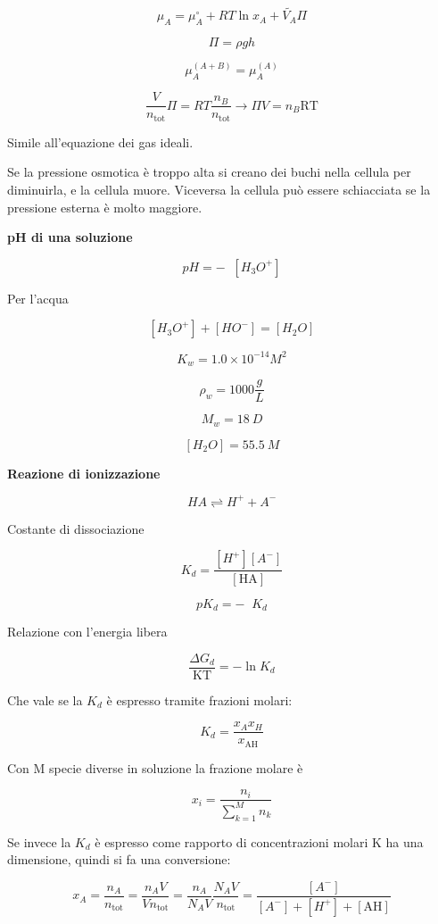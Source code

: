 \[\mu_{A} = \mu_{A}^{\circ} + RT\ln x_{A} + \tilde{V_{A}}\Pi\]

\[\Pi = \rho gh\]

\[\mu_{A}^{(A + B)} = \mu_{A}^{(A)}\]

\[\frac{V}{n_{\text{tot}}}\Pi = RT\frac{n_{B}}{n_{\text{tot}}} \rightarrow \Pi V = n_{B}\text{RT}\]

Simile all'equazione dei gas ideali.

Se la pressione osmotica è troppo alta si creano dei buchi nella cellula
per diminuirla, e la cellula muore. Viceversa la cellula può essere
schiacciata se la pressione esterna è molto maggiore.

\textbf{pH di una soluzione}

\[pH = - \operatorname{}\left\lbrack H_{3}O^{+} \right\rbrack\]

Per l'acqua

\[\left\lbrack H_{3}O^{+} \right\rbrack + \left\lbrack HO^{-} \right\rbrack = \left\lbrack H_{2}O \right\rbrack\]

\[K_{w} = 1.0 \times 10^{- 14}M^{2}\]

\[\rho_{w} = 1000\frac{g}{L}\]

\[M_{w} = 18\ D\]

\[\left\lbrack H_{2}O \right\rbrack = 55.5\ M\]

\textbf{Reazione di ionizzazione}

\[HA \rightleftharpoons H^{+} + A^{-}\]

Costante di dissociazione

\[K_{d} = \frac{\left\lbrack H^{+} \right\rbrack\left\lbrack A^{-} \right\rbrack}{\left\lbrack \text{HA} \right\rbrack}\]

\[pK_{d} = - \operatorname{}K_{d}\]

Relazione con l'energia libera

\[\frac{\Delta G_{d}}{\text{KT}} = - \ln K_{d}\]

Che vale se la \(K_{d}\) è espresso tramite frazioni molari:

\[K_{d} = \frac{x_{A}x_{H}}{x_{\text{AH}}}\]

Con M specie diverse in soluzione la frazione molare è

\[x_{i} = \frac{n_{i}}{\sum_{k = 1}^{M}n_{k}}\]

Se invece la \(K_{d}\) è espresso come rapporto di concentrazioni molari
K ha una dimensione, quindi si fa una conversione:

\[x_{A} = \frac{n_{A}}{n_{\text{tot}}} = \frac{n_{A}V}{Vn_{\text{tot}}} = \frac{n_{A}}{N_{A}V}\frac{N_{A}V}{n_{\text{tot}}} = \frac{\left\lbrack A^{-} \right\rbrack}{\left\lbrack A^{-} \right\rbrack + \left\lbrack H^{+} \right\rbrack + \left\lbrack \text{AH} \right\rbrack}\]

